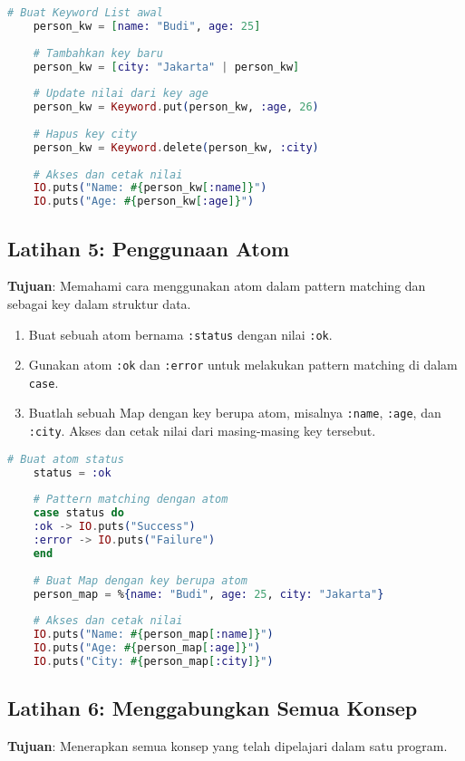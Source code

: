 \begin{lstlisting}[language=Elixir]
	# Buat Keyword List awal
	person_kw = [name: "Budi", age: 25]
	
	# Tambahkan key baru
	person_kw = [city: "Jakarta" | person_kw]
	
	# Update nilai dari key age
	person_kw = Keyword.put(person_kw, :age, 26)
	
	# Hapus key city
	person_kw = Keyword.delete(person_kw, :city)
	
	# Akses dan cetak nilai
	IO.puts("Name: #{person_kw[:name]}")
	IO.puts("Age: #{person_kw[:age]}")
\end{lstlisting}

\subsection{Latihan 5: Penggunaan Atom}
\textbf{Tujuan}: Memahami cara menggunakan atom dalam pattern matching dan sebagai key dalam struktur data.

\begin{enumerate}
	\item Buat sebuah atom bernama \texttt{:status} dengan nilai \texttt{:ok}.
	\item Gunakan atom \texttt{:ok} dan \texttt{:error} untuk melakukan pattern matching di dalam \texttt{case}.
	\item Buatlah sebuah Map dengan key berupa atom, misalnya \texttt{:name}, \texttt{:age}, dan \texttt{:city}. Akses dan cetak nilai dari masing-masing key tersebut.
\end{enumerate}

\begin{lstlisting}[language=Elixir]
	# Buat atom status
	status = :ok
	
	# Pattern matching dengan atom
	case status do
	:ok -> IO.puts("Success")
	:error -> IO.puts("Failure")
	end
	
	# Buat Map dengan key berupa atom
	person_map = %{name: "Budi", age: 25, city: "Jakarta"}
	
	# Akses dan cetak nilai
	IO.puts("Name: #{person_map[:name]}")
	IO.puts("Age: #{person_map[:age]}")
	IO.puts("City: #{person_map[:city]}")
\end{lstlisting}

\subsection{Latihan 6: Menggabungkan Semua Konsep}
\textbf{Tujuan}: Menerapkan semua konsep yang telah dipelajari dalam satu program.

